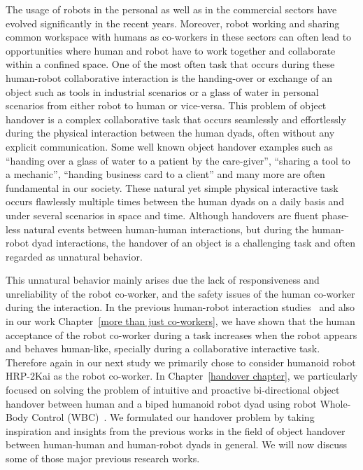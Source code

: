 The usage of robots in the personal as well as in the commercial sectors have evolved significantly in the recent years. Moreover, robot working and sharing common workspace with humans as co-workers in these sectors can often lead to opportunities where human and robot have to work together and collaborate within a confined space. One of the most often task that occurs during these human-robot collaborative interaction is the handing-over or exchange of an object such as tools in industrial scenarios or a glass of water in personal scenarios from either robot to human or vice-versa. This problem of object handover is a complex collaborative task that occurs seamlessly and effortlessly during the physical interaction between the human dyads, often without any explicit communication. Some well known object handover examples such as ``handing over a glass of water to a patient by the care-giver'', ``sharing a tool to a mechanic'', ``handing business card to a client'' and many more are often fundamental in our society. These natural yet simple physical interactive task occurs flawlessly multiple times between the human dyads on a daily basis and under several scenarios in space and time. Although handovers are fluent phase-less natural events between human-human interactions, but during the human-robot dyad interactions, the handover of an object is a challenging task and often regarded as unnatural behavior. 

This unnatural behavior mainly arises due the lack of responsiveness and unreliability of the robot co-worker, and the safety issues of the human co-worker during the interaction. In the previous human-robot interaction studies~\cite{huber2008human, strabala2013toward, shibata1995experimental} and also in our work Chapter~\ref{more than just co-workers}, we have shown that the human acceptance of the robot co-worker during a task increases when the robot appears and behaves human-like, specially during a collaborative interactive task. Therefore again in our next study we primarily chose to consider humanoid robot HRP-2Kai as the robot co-worker. In Chapter~\ref{handover chapter}, we particularly focused on solving the problem of intuitive and proactive bi-directional object handover between human and a biped humanoid robot dyad using robot Whole-Body Control (WBC)~\cite{ladder-HRP-2Kai, bouyarmane2011using, sentis2006whole}. We formulated our handover problem by taking inspiration and insights from the previous works in the field of object handover between human-human and human-robot dyads in general. We will now discuss some of those major previous research works.

